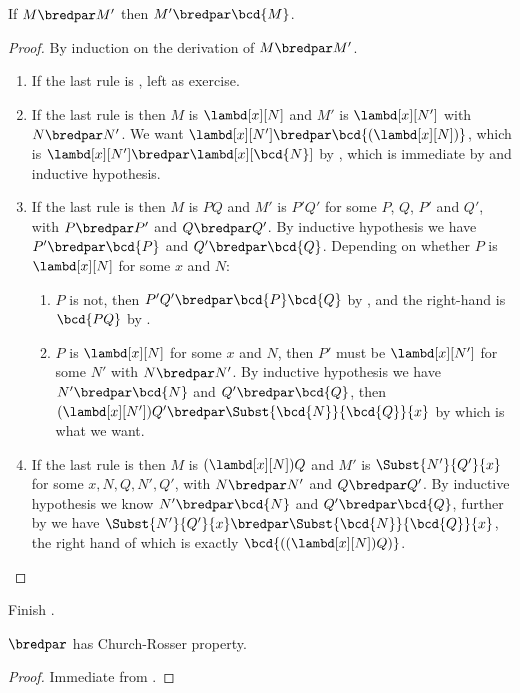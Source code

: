 \documentclass[../../../include/open-logic-section]{subfiles}
\begin{document}
\begin{lem}
  If $M \bredpar M'$ then $M' \bredpar \bcd{M}$.
\end{lem}
\begin{proof}
  By induction on the derivation of $M \bredpar M'$.
  \begin{enumerate}
    \item If the last rule is , left as exercise. 
    \item If the last rule is  then $M$ is 
      $\lambd[x][N]$ and $M'$ is $\lambd[x][N']$ with
      $N \bredpar N'$. We want $\lambd[x][N'] \bredpar
      \bcd{(\lambd[x][N])}$, which is $\lambd[x][N'] \bredpar
      \lambd[x][\bcd{N}]$ by , which is immediate by
       and inductive hypothesis.
    \item If the last rule is  then $M$ is 
      $PQ$ and $M'$ is $P'Q'$ for some $P$, $Q$, $P'$ and $Q'$, with $P \bredpar P'$
      and $Q \bredpar Q'$. By inductive hypothesis we have $P' \bredpar \bcd{P}$ and
      $Q' \bredpar \bcd{Q}$.  Depending on whether $P$ is 
      $\lambd[x][N]$ for some $x$ and $N$:
      \begin{enumerate}
        \item $P$ is not, then $P'Q' \bredpar \bcd{P}\bcd{Q}$ by
          , and the right-hand is $\bcd{PQ}$ by .
        \item $P$ is $\lambd[x][N]$ for some $x$ and $N$, then
          $P'$ must be $\lambd[x][N']$ for some $N'$ with 
          $N \bredpar N'$. By inductive hypothesis we have $N' \bredpar \bcd{N}$ and
          $Q' \bredpar \bcd{Q}$, then $(\lambd[x][N'])Q' \bredpar
          \Subst{\bcd{N}}{\bcd{Q}}{x}$ by  which is what
          we want.
      \end{enumerate}
    \item If the last rule is  then $M$ is 
      $(\lambd[x][N])Q$  and $M'$ is $\Subst{N'}{Q'}{x}$
      for some $x, N, Q, N', Q'$, with $N \bredpar N'$ and $Q
      \bredpar Q'$. By inductive hypothesis we know $N' \bredpar \bcd{N}$ and $Q'
      \bredpar \bcd{Q}$, further by  we have
      $\Subst{N'}{Q'}{x} \bredpar \Subst{\bcd{N}}{\bcd{Q}}{x}$, the
      right hand of which is exactly $\bcd{((\lambd[x][N])Q)}$.
  \end{enumerate}
\end{proof}

\begin{prob}
  Finish .
\end{prob}

\begin{thm}
  $\bredpar$ has Church-Rosser property.
\end{thm}
\begin{proof}
  Immediate from .
\end{proof}
\end{document}
